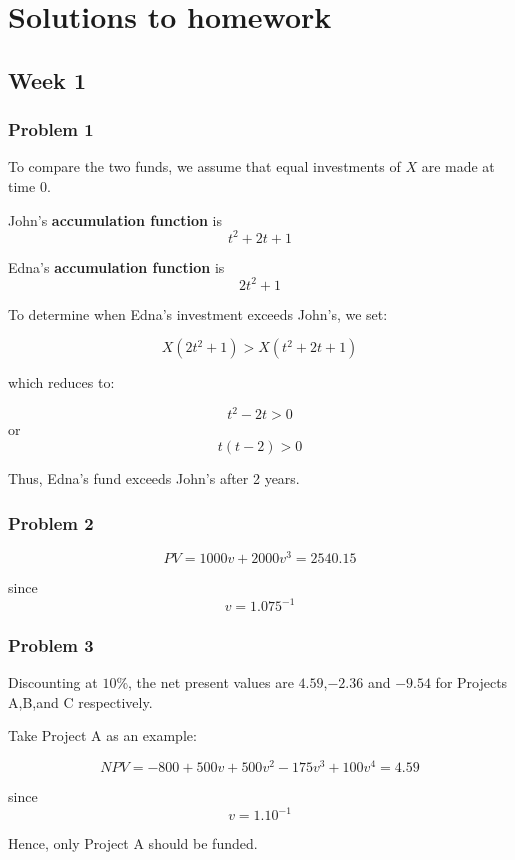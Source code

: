 \documentclass[
]{book}
\begin{document}
\hypertarget{solutions-to-homework}{%
\chapter*{Solutions to homework}\label{solutions-to-homework}}

\hypertarget{week-1}{%
\section*{Week 1}\label{week-1}}

\hypertarget{problem-1}{%
\subsection*{Problem 1}\label{problem-1}}

To compare the two funds, we assume that equal investments of \(X\) are made at time 0.

John's \textbf{accumulation function} is \[t^2+2t+1\]

Edna's \textbf{accumulation function} is \[2t^{2}+1\]

To determine when Edna's investment exceeds John's, we set:

\[ X(2t^{2}+1)>X(t^{2}+2t+1)\]

which reduces to:

\[t^{2}-2t>0\] or \[t(t-2)>0\]

Thus, Edna's fund exceeds John's after 2 years.

\hypertarget{problem-2}{%
\subsection*{Problem 2}\label{problem-2}}

\[PV=1000v+2000v^{3}=2540.15 \]

since \[v=1.075^{-1}\]

\hypertarget{problem-3}{%
\subsection*{Problem 3}\label{problem-3}}

Discounting at \(10\%\), the net present values are \(4.59\),\(-2.36\) and \(-9.54\) for Projects A,B,and C respectively.

Take Project A as an example:

\[NPV=-800+500v+500v^{2}-175v^{3}+100v^{4}=4.59\]

since \[v=1.10^{-1}\]

Hence, only Project A should be funded.

  
\end{document}
